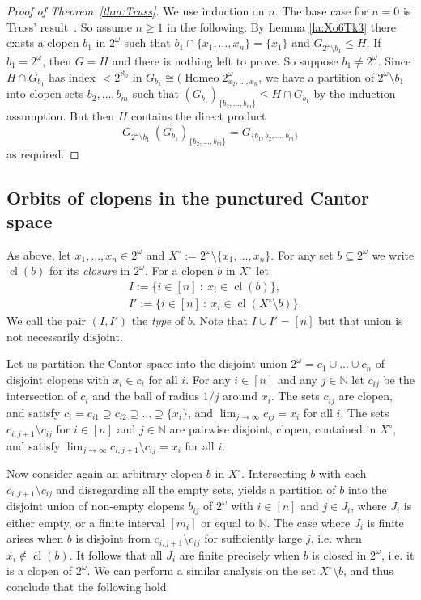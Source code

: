 \documentclass[12pt,a4paper,reqno]{amsart}
\numberwithin{equation}{section}
\theoremstyle{plain}
\theoremstyle{definition}
\newcommand{\N}{\mathbb{N}}
\DeclareMathOperator{\Homeo}{Homeo}
\DeclareMathOperator{\cl}{cl}
\newcommand{\st}{\: :\:}
\begin{document}
\begin{proof}[Proof of Theorem~\ref{thm:Truss}]
 We use induction on $n$.
 The base case for $n=0$ is Truss' result~\cite[Theorem 3.7]{Tr:IPG2}.
 So assume $n\geq 1$ in the following.
 By Lemma \ref{la:Xo6Tk3} there exists a clopen $b_1$ in $2^\omega$ such that $b_1\cap\{x_1,\dots,x_n\} = \{x_1\}$ and
 $G_{2^\omega\setminus b_1}\leq H$.
 If $b_1= 2^\omega$, then $G=H$ and there is nothing left to prove. So suppose $b_1\neq 2^\omega$.
 Since $H\cap G_{b_1}$ has index $<2^{\aleph_0}$ in $G_{b_1} \cong (\Homeo 2^\omega_{x_2,\dots,x_n}$,
 we have a partition of $2^\omega\setminus b_1$ into clopen sets $b_2,\dots,b_m$ such that
 $(G_{b_1})_{\{b_2,\dots,b_m\}} \leq H\cap G_{b_1}$ by the induction assumption.  
 But then $H$ contains the direct product
\[ G_{2^\omega\setminus b_1}\ (G_{b_1})_{\{b_2,\dots,b_m\}} = G_{\{b_1,b_2,\dots,b_m\}} \]
 as required.
\end{proof}


\subsection{Orbits of clopens in the punctured Cantor space}
As above, let %
$x_1,\dots,x_n\in 2^\omega$ and
$X^\circ := 2^\omega\setminus\{x_1,\dots,x_n\}$.
 For any set $b\subseteq  2^\omega$ we write $\cl(b)$ for its \emph{closure} in  $2^\omega$.
 For a clopen $b$ in $X^\circ$ let
\begin{align*}
  & I := \{i\in [n] \st x_i\in \cl(b) \}, \\
  & I' := \{ i\in [n] \st x_i\in \cl(X^\circ\setminus b)  \}.
\end{align*} 
 We call the pair  $(I,I')$ the \emph{type} of $b$. Note that $I\cup I' = [n]$ but that union is not necessarily disjoint.
 
Let us partition the Cantor space into the disjoint union $2^\omega=c_1\cup\dots\cup c_n$ of disjoint clopens with $x_i\in c_i$ for all $i$. For any $i\in [n]$ and any $j\in \N$ let $c_{ij}$ be the intersection of $c_i$ and the ball of radius $1/j$ around $x_i$.
  The sets $c_{ij}$ are clopen, and satisfy $c_i=c_{i1}\supseteq c_{i2}\supseteq \dots \supseteq \{x_i\}$,
  and $\lim_{j\rightarrow\infty}c_{ij}=x_i$ for all $i$.
The sets $c_{i,j+1}\setminus c_{ij}$ for $i\in [n]$ and $j\in\N$ are pairwise disjoint, clopen, contained in $X^\circ$, and satisfy 
$\lim_{j\rightarrow\infty}c_{i,j+1}\setminus c_{ij}=x_i$ for all $i$.

 
 Now consider again an arbitrary clopen $b$ in $X^\circ$.
 Intersecting $b$ with each  $c_{i,j+1}\setminus c_{ij}$ and disregarding all the empty sets, yields a partition of $b$ into the disjoint union of non-empty clopens $b_{ij}$ of $2^\omega$ with $i\in [n]$ and $j\in J_i$, where $J_i$ is either empty, or a finite interval $[m_i]$ or equal to $\N$.
The case where $J_i$ is finite arises when $b$ is disjoint from 
$c_{i,j+1}\setminus c_{ij}$ for sufficiently large $j$, i.e. when $x_i\not\in\cl(b)$.
It follows that all $J_i$ are finite precisely when $b$ is closed in $2^\omega$, i.e. it is a clopen of $2^\omega$.
We can perform a similar analysis on the set $X^\circ\setminus b$,
and thus conclude that the following hold:
\end{document}
